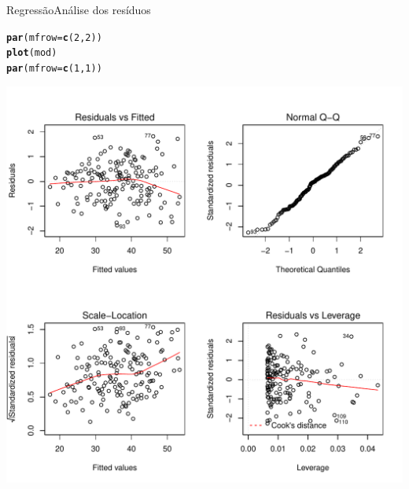 \documentclass[10pt]{beamer}\usepackage[]{graphicx}\usepackage[]{color}
\makeatletter
\newcommand{\hlnum}[1]{\textcolor[rgb]{0.686,0.059,0.569}{#1}}%
\newcommand{\hlstd}[1]{\textcolor[rgb]{0.345,0.345,0.345}{#1}}%
\newcommand{\hlkwc}[1]{\textcolor[rgb]{0.333,0.667,0.333}{#1}}%
\newcommand{\hlkwd}[1]{\textcolor[rgb]{0.737,0.353,0.396}{\textbf{#1}}}%
\newenvironment{kframe}{%
 \def\at@end@of@kframe{}%
 \ifinner\ifhmode%
  \def\at@end@of@kframe{\end{minipage}}%
  \begin{minipage}{\columnwidth}%
 \fi\fi%
 \def\FrameCommand##1{\hskip\@totalleftmargin \hskip-\fboxsep
 \colorbox{shadecolor}{##1}\hskip-\fboxsep
     \hskip-\linewidth \hskip-\@totalleftmargin \hskip\columnwidth}%
 \MakeFramed {\advance\hsize-\width
   \@totalleftmargin\z@ \linewidth\hsize
   \@setminipage}}%
 {\par\unskip\endMakeFramed%
 \at@end@of@kframe}
\newenvironment{knitrout}{}{} %
\theoremstyle{definition}
\makeatother
\begin{document}
\begin{frame}[fragile]{Regressão}{Análise dos resíduos}
\begin{knitrout}\footnotesize
{}\color{fgcolor}\begin{kframe}
\begin{alltt}
\hlkwd{par}\hlstd{(}\hlkwc{mfrow} \hlstd{=} \hlkwd{c}\hlstd{(}\hlnum{2}\hlstd{,}\hlnum{2}\hlstd{))}
\hlkwd{plot}\hlstd{(mod)}
\hlkwd{par}\hlstd{(}\hlkwc{mfrow} \hlstd{=} \hlkwd{c}\hlstd{(}\hlnum{1}\hlstd{,}\hlnum{1}\hlstd{))}
\end{alltt}
\end{kframe}

{\centering \includegraphics[width=.6\textwidth]{figure/unnamed-chunk-14-1} 

}



\end{knitrout}
\end{frame}
\end{document}
